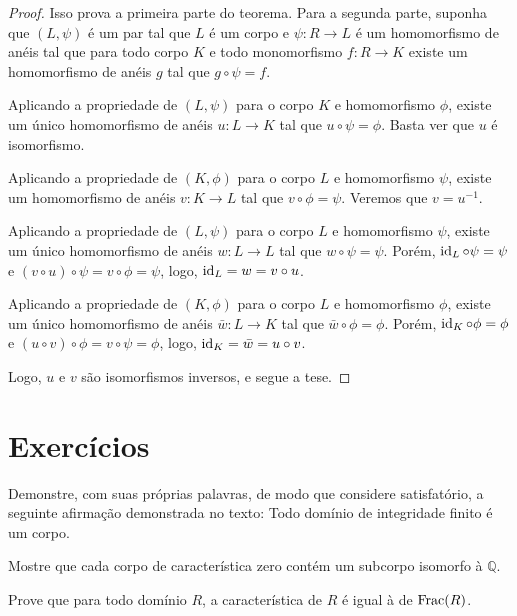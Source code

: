 \begin{proof}
    Isso prova a primeira parte do teorema.
    Para a segunda parte, suponha que $(L, \psi)$ é um par tal que $L$ é um corpo e $\psi:R\rightarrow L$ é um homomorfismo de anéis tal que para todo corpo $K$ e todo monomorfismo $f:R\rightarrow K$ existe um homomorfismo de anéis $g$ tal que $g\circ\psi=f$.

    Aplicando a propriedade de $(L, \psi)$ para o corpo $K$ e homomorfismo $\phi$, existe um único homomorfismo de anéis $u:L\rightarrow K$ tal que $u\circ \psi=\phi$.
    Basta ver que $u$ é isomorfismo.

    Aplicando a propriedade de $(K, \phi)$ para o corpo $L$ e homomorfismo $\psi$, existe um homomorfismo de anéis $v:K\rightarrow L$ tal que $v\circ \phi=\psi$.
    Veremos que $v=u^{-1}$.

    Aplicando a propriedade de $(L, \psi)$ para o corpo $L$ e homomorfismo $\psi$, existe um único homomorfismo de anéis $w:L\rightarrow L$ tal que $w\circ \psi=\psi$.
    Porém, $\operatorname{id}_L\circ \psi=\psi$ e $(v\circ u)\circ \psi=v\circ \phi=\psi$, logo, $\operatorname{id}_L=w=v\circ u$.

    Aplicando a propriedade de $(K, \phi)$ para o corpo $L$ e homomorfismo $\phi$, existe um único homomorfismo de anéis $\bar w:L\rightarrow K$ tal que $\bar w\circ \phi=\phi$.
    Porém, $\operatorname{id}_K\circ \phi=\phi$ e $(u\circ v)\circ \phi=v\circ \psi=\phi$, logo, $\operatorname{id}_K=\bar w=u\circ v$.

    Logo, $u$ e $v$ são isomorfismos inversos, e segue a tese.

\end{proof}
\section{Exercícios}
\begin{exer}
    Demonstre, com suas próprias palavras, de modo que considere satisfatório, a seguinte afirmação demonstrada no texto: Todo domínio de integridade finito é um corpo.
\end{exer}
\begin{exer}
    Mostre que cada corpo de característica zero contém um subcorpo isomorfo à $\mathbb Q$.
\end{exer}
\begin{exer}
    Prove que para todo domínio $R$, a característica de $R$ é igual à de $\operatorname{Frac}(R)$.
\end{exer}